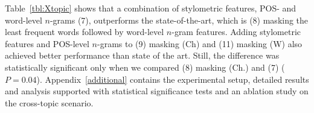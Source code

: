 \documentclass[11pt]{article}
\begin{document}





Table~\ref{tbl:Xtopic} shows that a combination of stylometric features, POS- and word-level $n$-grams (7), outperforms the state-of-the-art, which is (8) masking the least frequent words followed by word-level $n$-gram features. Adding stylometric features and POS-level $n$-grams to (9) masking (Ch) and (11) masking (W) also achieved better performance than state of the art. Still, the difference was statistically significant only when we compared (8) masking (Ch.) and (7) ($P=0.04$). Appendix~\ref{additional} contains the experimental setup, detailed results and analysis supported with statistical significance tests and an ablation study on the cross-topic scenario.
\end{document}

